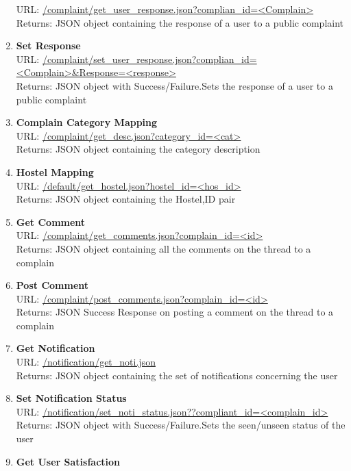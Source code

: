 \documentclass{article}
\begin{document}
\begin{enumerate}
						URL: \url{/complaint/get_user_response.json?complian_id=<Complain>}\\
						Returns:  JSON object containing the response of a user to a public complaint 
					\item \textbf{Set Response} \\
						URL: \url{/complaint/set_user_response.json?complian_id=<Complain>&Response=<response>}\\
						Returns:   JSON object with Success/Failure.Sets the response of a user to a public complaint 
					\item \textbf{Complain Category Mapping} \\
						URL: \url{/complaint/get_desc.json?category_id=<cat>}\\
						Returns:   JSON object containing the category description 
					\item \textbf{Hostel Mapping} \\
						URL: \url{/default/get_hostel.json?hostel_id=<hos_id>}\\
						Returns:  JSON object containing the Hostel,ID pair 
					\item \textbf{Get Comment} \\
						URL: \url{/complaint/get_comments.json?complain_id=<id>}\\
						Returns:  JSON object containing all the comments on the thread to a complain
					\item \textbf{Post Comment} \\
						URL: \url{/complaint/post_comments.json?complain_id=<id>}\\
						Returns: JSON Success Response on posting a comment on the thread to a complain
					\item \textbf{Get Notification} \\
						URL: \url{/notification/get_noti.json}\\
						Returns: JSON object containing the set of notifications concerning the user
					\item \textbf{Set Notification Status} \\
						URL: \url{/notification/set_noti_status.json??compliant_id=<complain_id>}\\
						Returns: JSON object with Success/Failure.Sets the seen/unseen status of the user
					\item \textbf{Get User Satisfaction} \\

\end{enumerate}
\end{document}
